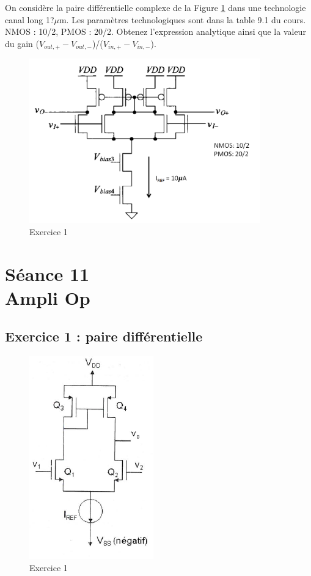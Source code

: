 \documentclass[paper=a4, fontsize=11pt]{article} %
\numberwithin{equation}{section} %
\numberwithin{figure}{section} %
\numberwithin{table}{section} %
\begin{document}
On considère la paire différentielle complexe de la Figure \ref{fig11-2} dans une technologie canal long 1?$\mu$m. Les paramètres technologiques sont dans la table 9.1 du cours. NMOS : 10/2, PMOS : 20/2. 
Obtenez l'expression analytique ainsi que la valeur du gain ($V_{out,+}-V_{out,-}$)/($V_{in,+}-V_{in,-}$).
\newpage
\begin{figure}[!htbp]
   \centering
   \includegraphics[width=10cm]{figure/fig11-2.png}
   \caption{Exercice 1}
   \label{fig11-2}
\end{figure}



















\newpage
\setcounter{figure}{0}
\setcounter{section}{11}
\section{Séance 11\\ Ampli Op}

\subsection*{Exercice 1 : paire différentielle}
\begin{figure}[!htbp]
   \centering
   \includegraphics[]{figure/fig12-1-1.png}
   \caption{Exercice 1}
   \label{fig12-1-1}
\end{figure}
\end{document}

